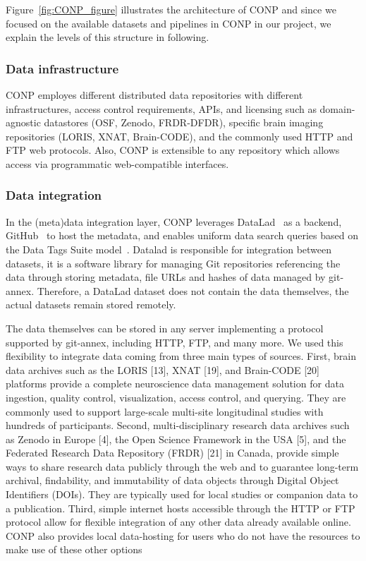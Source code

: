 Figure~\ref{fig:CONP_figure} illustrates the architecture of CONP and since we focused on the available datasets and pipelines in CONP in our project, we explain the levels of this structure in following. 

\subsubsection{Data infrastructure}
CONP employes different distributed data repositories with different infrastructures, access control requirements, APIs, and licensing such as domain-agnostic datastores (OSF, Zenodo, FRDR-DFDR), specific brain imaging repositories (LORIS, XNAT, Brain-CODE), and the commonly used HTTP and FTP web protocols. Also, CONP is extensible to any repository which allows access via programmatic web-compatible interfaces.

\subsubsection{Data integration}
In the (meta)data integration layer, CONP leverages DataLad~\cite{} as a backend, GitHub~\cite{} to host the metadata, and enables uniform data search queries based on the Data Tags Suite model~\cite{}. Datalad is responsible for integration between datasets, it is a software library for managing Git repositories referencing the data through storing metadata, file URLs and hashes of data managed by git-annex. Therefore, a DataLad dataset does not contain the data themselves, the actual datasets remain stored remotely.

The data themselves can be stored in any server implementing a protocol supported by git-annex, including HTTP, FTP, and many more. We used this flexibility to integrate data coming from three main types of sources. First, brain data archives such as the LORIS [13], XNAT [19], and Brain-CODE [20] platforms provide a complete neuroscience data management solution for data ingestion, quality control, visualization, access control, and querying. They are commonly used to support large-scale multi-site longitudinal studies with hundreds of participants. Second, multi-disciplinary research data archives such as Zenodo in Europe [4], the Open Science Framework in the USA [5], and the Federated Research Data Repository (FRDR) [21] in Canada, provide simple ways to share research data publicly through the web and to guarantee long-term archival, findability, and immutability of data objects through Digital Object Identifiers (DOIs). They are typically used for local studies or companion data to a publication. Third, simple internet hosts accessible through the HTTP or FTP protocol allow for flexible integration of any other data already available online. CONP also provides local data-hosting for users who do not have the resources to make use of these other options 



